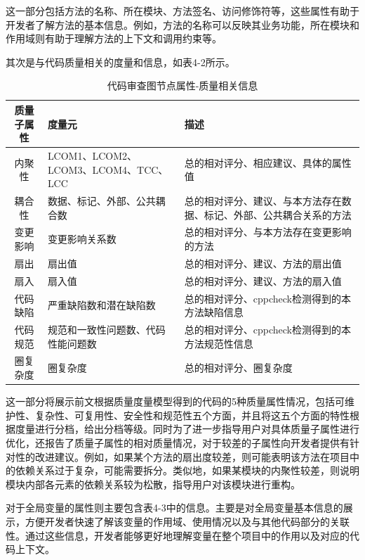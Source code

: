这一部分包括方法的名称、所在模块、方法签名、访问修饰符等，这些属性有助于开发者了解方法的基本信息。例如，方法的名称可以反映其业务功能，所在模块和作用域则有助于理解方法的上下文和调用约束等。

其次是与代码质量相关的度量和信息，如表4-2所示。

\begin{table}[htbp]
    \caption{代码审查图节点属性-质量相关信息}
    \vspace{0.5em}\centering\wuhao
    \begin{tabular}{cp{6cm}p{6cm}}
    \toprule
    质量子属性 & 度量元 & 描述 \\
    \midrule
    内聚性& LCOM1、LCOM2、LCOM3、LCOM4、TCC、LCC &  总的相对评分、相应建议、具体的属性值 \\           
    耦合性& 数据、标记、外部、公共耦合数 &  总的相对评分、建议、与本方法存在数据、标记、外部、公共耦合关系的方法 \\       
    变更影响 & 变更影响关系数 & 总的相对评分、与本方法存在变更影响的方法 \\
    扇出 &扇出值 &  总的相对评分、建议、方法的扇出值 \\
    扇入 &扇入值 &  总的相对评分、建议、方法的扇入值 \\ 
    代码缺陷 & 严重缺陷数和潜在缺陷数 &  总的相对评分、cppcheck检测得到的本方法缺陷信息 \\    
    代码规范 &  规范和一致性问题数、代码性能问题数 &  总的相对评分、cppcheck检测得到的本方法规范性信息 \\    
    圈复杂度 & 圈复杂度 & 总的相对评分、圈复杂度\\    
    \bottomrule
    \end{tabular}
    \end{table}

这一部分将展示前文根据质量度量模型得到的代码的5种质量属性情况，包括可维护性、复杂性、可复用性、安全性和规范性五个方面，并且将这五个方面的特性根据度量进行分档，给出分档等级。同时为了进一步指导用户对具体质量子属性进行优化，还报告了质量子属性的相对质量情况，对于较差的子属性向开发者提供有针对性的改进建议。例如，如果某个方法的扇出度较差，则可能表明该方法在项目中的依赖关系过于复杂，可能需要拆分。类似地，如果某模块的内聚性较差，则说明模块内部各元素的依赖关系较为松散，指导用户对该模块进行重构。

对于全局变量的属性则主要包含表4-3中的信息。主要是对全局变量基本信息的展示，方便开发者快速了解该变量的作用域、使用情况以及与其他代码部分的关联性。通过这些信息，开发者能够更好地理解变量在整个项目中的作用以及对应的代码上下文。

